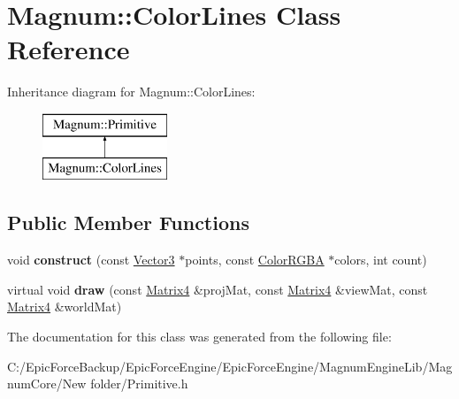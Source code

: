 \hypertarget{class_magnum_1_1_color_lines}{}\section{Magnum\+:\+:Color\+Lines Class Reference}
\label{class_magnum_1_1_color_lines}
Inheritance diagram for Magnum\+:\+:Color\+Lines\+:\begin{figure}[H]
\begin{center}
\leavevmode
\includegraphics[height=2.000000cm]{class_magnum_1_1_color_lines}
\end{center}
\end{figure}
\subsection*{Public Member Functions}
\begin{DoxyCompactItemize}
\item 
void {\bfseries construct} (const \hyperlink{class_magnum_1_1_vector3}{Vector3} $\ast$points, const \hyperlink{class_magnum_1_1_color_r_g_b_a}{Color\+R\+G\+BA} $\ast$colors, int count)\hypertarget{class_magnum_1_1_color_lines_ad290ff0aa4497a285e2941f7e031a46e}{}\label{class_magnum_1_1_color_lines_ad290ff0aa4497a285e2941f7e031a46e}

\item 
virtual void {\bfseries draw} (const \hyperlink{class_magnum_1_1_matrix4}{Matrix4} \&proj\+Mat, const \hyperlink{class_magnum_1_1_matrix4}{Matrix4} \&view\+Mat, const \hyperlink{class_magnum_1_1_matrix4}{Matrix4} \&world\+Mat)\hypertarget{class_magnum_1_1_color_lines_a7a8e11147ba54e0cd85f9ea1568ac90e}{}\label{class_magnum_1_1_color_lines_a7a8e11147ba54e0cd85f9ea1568ac90e}

\end{DoxyCompactItemize}


The documentation for this class was generated from the following file\+:\begin{DoxyCompactItemize}
\item 
C\+:/\+Epic\+Force\+Backup/\+Epic\+Force\+Engine/\+Epic\+Force\+Engine/\+Magnum\+Engine\+Lib/\+Magnum\+Core/\+New folder/Primitive.\+h\end{DoxyCompactItemize}
